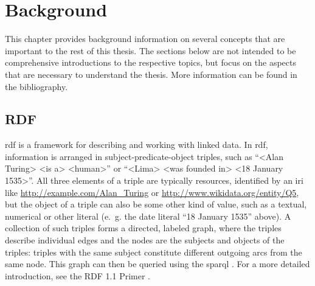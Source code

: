 
\chapter{Background}
\label{ch:Background}


This chapter provides background information
on several concepts that are important to the rest of this thesis.
The sections below are not intended to be comprehensive introductions to the respective topics,
but focus on the aspects that are necessary to understand the thesis.
More information can be found in the bibliography. %

\section{RDF}
\label{sec:Background:RDF}

\acrfull{rdf}
\cite{Lanthaler:14:RCA}
is a framework for describing and working with linked data.
In \gls{rdf}, information is arranged in \gls{subject}-\gls{predicate}-\gls{object} \glspl{triple},
such as “<Alan Turing> <is a> <human>”
or “<Lima> <was founded in> <18 January 1535>”.
All three elements of a \gls{triple} are typically \glspl{resource},
identified by an \gls{iri} like \url{http://example.com/Alan_Turing} or \url{http://www.wikidata.org/entity/Q5},
but the \gls{object} of a \gls{triple} can also be some other kind of value,
such as a textual, numerical or other literal
(e.~g. the date literal “18 January 1535” above). %
A collection of such \glspl{triple} forms a directed, labeled graph,
where the \glspl{triple} describe individual edges
and the nodes are the \glspl{subject} and \glspl{object} of the \glspl{triple}:
\glspl{triple} with the same \gls{subject} constitute different outgoing arcs from the same node.
This graph can then be queried using the \acrfull{sparql} \cite{9569543}. %
For a more detailed introduction,
see the RDF 1.1 Primer \cite{Schreiber:14:RP}.

